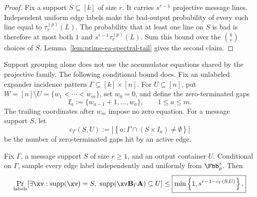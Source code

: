 \begin{proof}
Fix a support $S\subseteq[k]$ of size $r$.  It carries $s^{r-1}$
projective message lines.  Independent uniform edge labels make the bad-output
probability of every such line equal to $\tau^{(p)}_r(L)$.  The probability
that at least one line on $S$ is bad is therefore at most both $1$ and
$s^{r-1}\tau^{(p)}_r(L)$.  Sum this bound over the $\binom{k}{r}$ choices of
$S$.  Lemma~\ref{lem:prime-ea-spectral-tail} gives the second claim.
\end{proof}

Support grouping alone does not use the accumulator equations shared by the
projective family.  The following conditional bound does.  Fix an unlabeled
expander incidence pattern $\Gamma\subseteq[k]\times[n]$.  For
$U\subseteq[n]$, put $W=[n]\setminus U=\{w_1<\cdots<w_m\}$, set $w_0=0$, and
define the zero-terminated gaps
\begin{equation}
 I_a:=\{w_{a-1}+1,\ldots,w_a\},\qquad 1\leq a\leq m.
 \label{eq:prime-ea-zero-gaps}
\end{equation}
The trailing coordinates after $w_m$ impose no zero equation.  For a message
support $S$, let
\begin{equation}
 c_\Gamma(S,U)
 :=\left|\left\{a:\Gamma\cap(S\times I_a)\ne\emptyset\right\}\right|
 \label{eq:prime-ea-gap-rank}
\end{equation}
be the number of zero-terminated gaps hit by an active edge.

\begin{lemma}
\label{lem:prime-ea-projective-surplus}
Fix $\Gamma$, a message support $S$ of size $r\geq1$, and an output container
$U$.  Conditional on $\Gamma$, sample every edge label independently and
uniformly from $\Fbb_p^*$.  Then
\begin{equation}
 \Pr_{\mathrm{labels}}\!\left[
  \exists\xv:\operatorname{supp}(\xv)=S,\
  \operatorname{supp}(\xv\B_\Gamma\A)\subseteq U
 \right]
 \leq
 \boxed{\min\left\{1,s^{r-1-c_\Gamma(S,U)}\right\}.}
 \label{eq:prime-ea-projective-surplus}
\end{equation}
\end{lemma}

